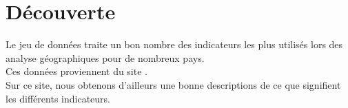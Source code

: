 \section{Découverte}
Le jeu de données traite un bon nombre des indicateurs les plus utilisés lors des analyse géographiques pour de nombreux pays.\\
Ces données proviennent du site \lesite.\\
Sur ce site, nous obtenons d'ailleurs une bonne descriptions de ce que signifient les différents indicateurs.